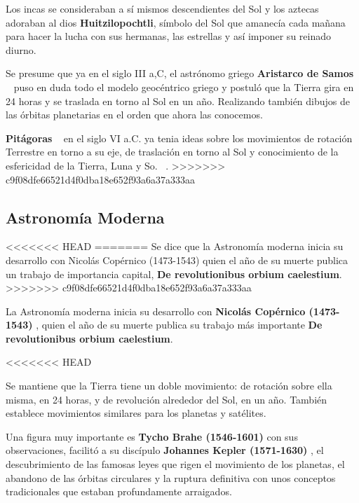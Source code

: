 \bigskip
Los incas se consideraban a sí mismos descendientes del Sol y los aztecas adoraban al dios \textbf{Huitzilopochtli}, símbolo del Sol
que amanecía cada mañana para hacer la lucha con sus hermanas, las estrellas y así imponer su reinado diurno.
\newline

\bigskip
Se presume que ya en el  siglo III a,C, el astrónomo griego \textbf{Aristarco de Samos} ~\cite{Arist} puso en duda todo el modelo geocéntrico griego y postuló que la Tierra gira en 24 horas y se traslada en torno al Sol en un año. Realizando también dibujos de las órbitas planetarias en el orden que ahora las conocemos.

\bigskip
\textbf{Pitágoras} ~\cite{Pitagoras} en el siglo VI  a.C. ya tenia ideas sobre los movimientos de rotación  Terrestre en torno a su eje, de traslación en torno al Sol y conocimiento de la esfericidad de la Tierra, Luna y So.  ~\cite{AstroAnti}.
>>>>>>> c9f08dfe66521d4f0dba18e652f93a6a37a333aa


\subsection{Astronomía Moderna}

<<<<<<< HEAD
=======
\bigskip
Se dice que la Astronomía moderna\cite{AstMod} inicia su desarrollo con Nicolás Copérnico (1473-1543)  quien el año de su muerte publica un trabajo de importancia capital, \textbf{De revolutionibus orbium caelestium}\cite{Copernico}.
>>>>>>> c9f08dfe66521d4f0dba18e652f93a6a37a333aa

La Astronomía moderna \cite{AstMod} inicia su desarrollo con \textbf{Nicolás Copérnico (1473-1543)} \cite{Copernico}, quien el año de su muerte publica su trabajo más importante \textbf{De revolutionibus orbium caelestium}.

<<<<<<< HEAD

Se mantiene que la Tierra tiene un doble movimiento: de rotación sobre ella misma, en 24 horas, y de revolución alrededor del Sol, en un año. También establece movimientos similares para los planetas y satélites.


Una figura muy importante es \textbf{Tycho Brahe (1546-1601)} \cite{Tycho} con  sus observaciones, facilitó a su discípulo \textbf{Johannes Kepler (1571-1630)} \cite{Kepler}, el descubrimiento de las famosas leyes que rigen el movimiento de los planetas, el abandono de las órbitas circulares y la ruptura definitiva con unos conceptos tradicionales que estaban profundamente arraigados. 



